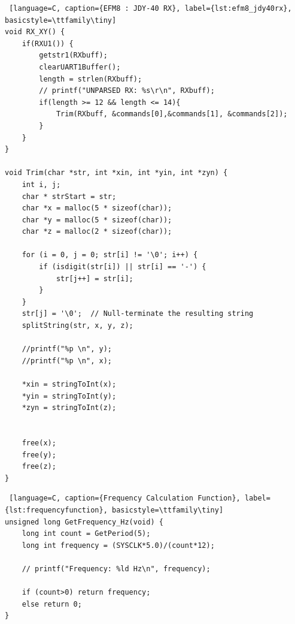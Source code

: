 \documentclass{article}
\begin{document}
\begin{lstlisting} [language=C, caption={EFM8 : JDY-40 RX}, label={lst:efm8_jdy40rx}, basicstyle=\ttfamily\tiny]
void RX_XY() {
    if(RXU1()) {
	    getstr1(RXbuff);
	    clearUART1Buffer();
	    length = strlen(RXbuff);
        // printf("UNPARSED RX: %s\r\n", RXbuff);
	    if(length >= 12 && length <= 14){
	    	Trim(RXbuff, &commands[0],&commands[1], &commands[2]);
	    }
	}
}

void Trim(char *str, int *xin, int *yin, int *zyn) {
    int i, j;
    char * strStart = str;
    char *x = malloc(5 * sizeof(char));
    char *y = malloc(5 * sizeof(char));
    char *z = malloc(2 * sizeof(char));

    for (i = 0, j = 0; str[i] != '\0'; i++) {
        if (isdigit(str[i]) || str[i] == '-') {
            str[j++] = str[i];
        }
    }
    str[j] = '\0';  // Null-terminate the resulting string
    splitString(str, x, y, z);

    //printf("%p \n", y);
    //printf("%p \n", x);

    *xin = stringToInt(x);
    *yin = stringToInt(y);
    *zyn = stringToInt(z);


    free(x);
    free(y);
    free(z);
}
\end{lstlisting}

\begin{lstlisting} [language=C, caption={Frequency Calculation Function}, label={lst:frequencyfunction}, basicstyle=\ttfamily\tiny]
unsigned long GetFrequency_Hz(void) {
    long int count = GetPeriod(5);
    long int frequency = (SYSCLK*5.0)/(count*12);

    // printf("Frequency: %ld Hz\n", frequency);

    if (count>0) return frequency;
    else return 0;
}
\end{lstlisting}
\end{document}
